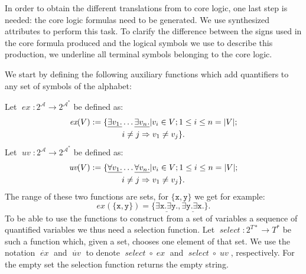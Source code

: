 In order to obtain the different translations from \nthree to core logic, 
one last step is needed: the core logic formulas need to be generated. %
We use synthesized attributes to perform this task. To clarify the difference between the signs used in the core formula produced and the
logical symbols we use to describe this production, we underline all terminal symbols belonging to the core logic. 

We start by defining the following auxiliary functions 
which add quantifiers to any set of symbols of the alphabet: %

Let $\operatorname{\textit{ex}}: 2^\mathcal{A}\rightarrow 2^{\mathcal{A}^*}$ be defined as:
\begin{multline}\notag \operatorname{\textit{ex}}(V):= \{\underline{\exists v_1.}\ldots \underline{\exists v_n.}| v_i \in V; 1\leq i \leq n=|V|; \\ i\neq j \Rightarrow v_1 \neq v_j\}.\end{multline}
%
Let $\operatorname{\textit{uv}}: 2^\mathcal{A}\rightarrow 2^{\mathcal{A}^*}$ be defined as:
\begin{multline}\notag \operatorname{\textit{uv}}(V):= \{\underline{\forall v_1.}\ldots \underline{\forall v_n.}| v_i \in V; 1\leq i \leq n=|V|; \\ i\neq j \Rightarrow v_1 \neq v_j\}.
\end{multline}
%
The range of these two functions are sets, for $\{\texttt{x}, \texttt{y}\}$ we get for example:
\[\textit{ex}(\{\texttt{x}, \texttt{y}\})=\{ \underline{\exists \texttt{x}.\exists \texttt{y}.}, \underline{\exists \texttt{y}.\exists \texttt{x}.}\}.\]
To be able to use the functions to construct from a set of variables a sequence of quantified variables we thus need a selection function.
Let $\operatorname{\textit{select}}: 2^{T*}\rightarrow T^*$ be such a function which, given a set, chooses one element of that set.
We use the notation $\dot{\operatorname{\textit{ex}}}$ and $\dot{\operatorname{\textit{uv}}}$ to denote 
$\operatorname{\textit{select}}\circ \operatorname{\textit{ex}}$ and $\operatorname{\textit{select}}\circ \operatorname{\textit{uv}}$,
respectively. For the empty set the selection function returns the empty string.

